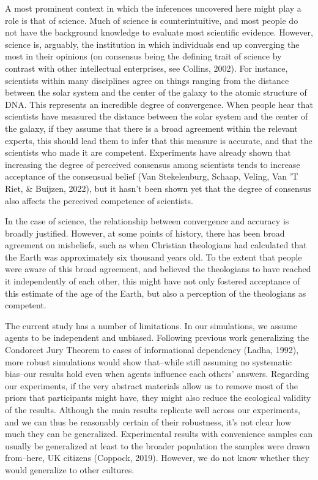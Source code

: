 \documentclass[
  doc,floatsintext]{apa6}
\begin{document}
A most prominent context in which the inferences uncovered here might play a role is that of science. Much of science is counterintuitive, and most people do not have the background knowledge to evaluate most scientific evidence. However, science is, arguably, the institution in which individuals end up converging the most in their opinions (on consensus being the defining trait of science by contrast with other intellectual enterprises, see Collins, 2002). For instance, scientists within many disciplines agree on things ranging from the distance between the solar system and the center of the galaxy to the atomic structure of DNA. This represents an incredible degree of convergence. When people hear that scientists have measured the distance between the solar system and the center of the galaxy, if they assume that there is a broad agreement within the relevant experts, this should lead them to infer that this measure is accurate, and that the scientists who made it are competent. Experiments have already shown that increasing the degree of perceived consensus among scientists tends to increase acceptance of the consensual belief (Van Stekelenburg, Schaap, Veling, Van 'T Riet, \& Buijzen, 2022), but it hasn't been shown yet that the degree of consensus also affects the perceived competence of scientists.

In the case of science, the relationship between convergence and accuracy is broadly justified. However, at some points of history, there has been broad agreement on misbeliefs, such as when Christian theologians had calculated that the Earth was approximately six thousand years old. To the extent that people were aware of this broad agreement, and believed the theologians to have reached it independently of each other, this might have not only fostered acceptance of this estimate of the age of the Earth, but also a perception of the theologians as competent.

The current study has a number of limitations. In our simulations, we assume agents to be independent and unbiased. Following previous work generalizing the Condorcet Jury Theorem to cases of informational dependency (Ladha, 1992), more robust simulations would show that--while still assuming no systematic bias--our results hold even when agents influence each others' answers. Regarding our experiments, if the very abstract materials allow us to remove most of the priors that participants might have, they might also reduce the ecological validity of the results. Although the main results replicate well across our experiments, and we can thus be reasonably certain of their robustness, it's not clear how much they can be generalized. Experimental results with convenience samples can usually be generalized at least to the broader population the samples were drawn from--here, UK citizens (Coppock, 2019). However, we do not know whether they would generalize to other cultures.
\end{document}
